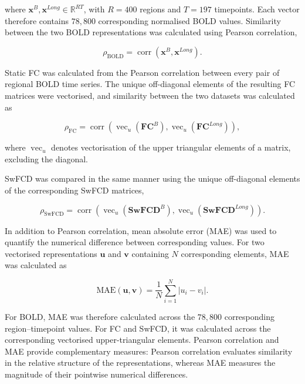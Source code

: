 where
$\mathbf{x}^{B},\mathbf{x}^{Long}\in\mathbb{R}^{RT}$,
with $R=400$ regions and $T=197$ timepoints. Each vector therefore
contains $78{,}800$ corresponding normalised BOLD values. Similarity
between the two BOLD representations was calculated using Pearson
correlation,

\begin{equation}
    \rho_{\mathrm{BOLD}}
    =
    \operatorname{corr}
    \left(
        \mathbf{x}^{B},
        \mathbf{x}^{Long}
    \right).
\end{equation}

Static FC was calculated from the Pearson correlation between every
pair of regional BOLD time series. The unique off-diagonal elements of
the resulting FC matrices were vectorised, and similarity between the
two datasets was calculated as

\begin{equation}
    \rho_{\mathrm{FC}}
    =
    \operatorname{corr}
    \left(
        \operatorname{vec}_{u}(\mathbf{FC}^{B}),
        \operatorname{vec}_{u}(\mathbf{FC}^{Long})
    \right),
\end{equation}

where $\operatorname{vec}_{u}$ denotes vectorisation of the upper
triangular elements of a matrix, excluding the diagonal.

SwFCD was compared in the same manner using the unique off-diagonal
elements of the corresponding SwFCD matrices,

\begin{equation}
    \rho_{\mathrm{SwFCD}}
    =
    \operatorname{corr}
    \left(
        \operatorname{vec}_{u}(\mathbf{SwFCD}^{B}),
        \operatorname{vec}_{u}(\mathbf{SwFCD}^{Long})
    \right).
\end{equation}

In addition to Pearson correlation, mean absolute error (MAE) was used
to quantify the numerical difference between corresponding values. For
two vectorised representations $\mathbf{u}$ and $\mathbf{v}$ containing
$N$ corresponding elements, MAE was calculated as

\begin{equation}
    \mathrm{MAE}(\mathbf{u},\mathbf{v})
    =
    \frac{1}{N}
    \sum_{i=1}^{N}
    \left|u_i-v_i\right|.
\end{equation}

For BOLD, MAE was therefore calculated across the $78{,}800$
corresponding region--timepoint values. For FC and SwFCD, it was
calculated across the corresponding vectorised upper-triangular
elements. Pearson correlation and MAE provide complementary measures:
Pearson correlation evaluates similarity in the relative structure of
the representations, whereas MAE measures the magnitude of their
pointwise numerical differences.

